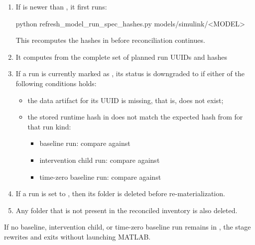 \documentclass[11pt]{article}
\begin{document}
\begin{enumerate}
\item If  is newer than , it first runs:
\begin{DocCode}
python refresh_model_run_spec_hashes.py models/simulink/<MODEL>
\end{DocCode}
This recomputes the hashes in  before reconciliation continues.
\item It computes from  the complete set of planned run UUIDs and hashes
	\item If a run is currently marked as , its status is downgraded to  if either of the following conditions holds:
	  \begin{itemize}
	  \item the data artifact for its UUID is missing, that is,  does not exist;
	  \item the stored runtime hash in  does not match the expected hash from  for that run kind:
	    \begin{itemize}
	    \item baseline run: compare  against 
	    \item intervention child run: compare  against 
	    \item time-zero baseline run: compare  against 
	    \end{itemize}
	  \end{itemize}
	\item If a run is set to , then its folder  is deleted before re-materialization.
\item Any folder  that is not present in the reconciled  inventory is also deleted.
\end{enumerate}


If no baseline, intervention child, or time-zero baseline run remains in , the stage rewrites  and exits without launching MATLAB.  
\end{document}
